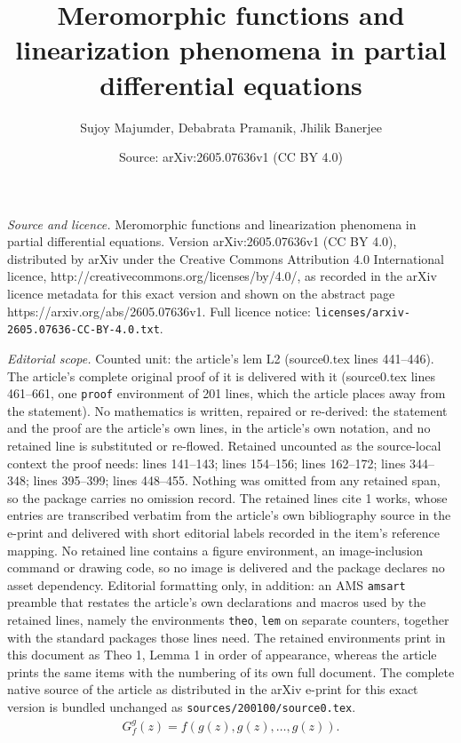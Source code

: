 \documentclass[10pt,a4paper]{amsart}
\title{\LARGE M\Large \MakeLowercase{eromorphic Functions and Linearization Phenomena in Partial Differential Equations}}
\author{Sujoy Majumder, Debabrata Pramanik, Jhilik Banerjee}
\date{Source: arXiv:2605.07636v1 (CC BY 4.0)}
\begin{document}
\maketitle

\noindent\emph{Source and licence.} \LARGE M\Large \MakeLowercase{eromorphic Functions and Linearization Phenomena in Partial Differential Equations}. Version arXiv:2605.07636v1 (CC BY 4.0), distributed by arXiv under the Creative Commons Attribution 4.0 International licence, http://creativecommons.org/licenses/by/4.0/, as recorded in the arXiv licence metadata for this exact version and shown on the abstract page https://arxiv.org/abs/2605.07636v1. Full licence notice: \texttt{licenses/arxiv-2605.07636-CC-BY-4.0.txt}.\par\smallskip

\noindent\textit{Editorial scope.} Counted unit: the article's lem L2 (source0.tex lines 441--446). The article's complete original proof of it is delivered with it (source0.tex lines 461--661, one \texttt{proof} environment of 201 lines, which the article places away from the statement). No mathematics is written, repaired or re-derived: the statement and the proof are the article's own lines, in the article's own notation, and no retained line is substituted or re-flowed.  Retained uncounted as the source-local context the proof needs: lines 141--143; lines 154--156; lines 162--172; lines 344--348; lines 395--399; lines 448--455.  Nothing was omitted from any retained span, so the package carries no omission record.  The retained lines cite 1 works, whose entries are transcribed verbatim from the article's own bibliography source in the e-print and delivered with short editorial labels recorded in the item's reference mapping.  No retained line contains a figure environment, an image-inclusion command or drawing code, so no image is delivered and the package declares no asset dependency.  Editorial formatting only, in addition: an AMS \texttt{amsart} preamble that restates the article's own declarations and macros used by the retained lines, namely the environments \texttt{theo}, \texttt{lem} on separate counters, together with the standard packages those lines need.  The retained environments print in this document as Theo 1, Lemma 1 in order of appearance, whereas the article prints the same items with the numbering of its own full document.  The complete native source of the article as distributed in the arXiv e-print for this exact version is bundled unchanged as \texttt{sources/200100/source0.tex}.
\begin{align}\label{eq}
G^g_f(z)=f(g(z),g(z),\ldots,g(z)).
\end{align}
\end{document}
